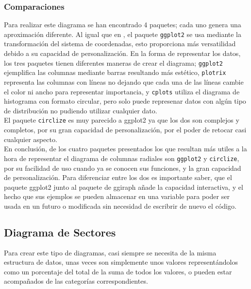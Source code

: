 \documentclass{article}\usepackage[]{graphicx}\usepackage[]{color}
\begin{document}
\subsubsection{Comparaciones}
Para realizar este diagrama se han encontrado 4 paquetes; cada uno genera una aproximaci\'on diferente.
Al igual que en , 
el paquete \texttt{ggplot2} se usa mediante la transformaci\'on del sistema de coordenadas, esto proporciona m\'as versatilidad debido a su capacidad de personalizaci\'on. En la forma de representar los datos, los tres paquetes tienen diferentes maneras de crear el diagrama; \texttt{ggplot2} ejemplifica las columnas mediante barras resultando m\'as est\'etico, \texttt{plotrix} representa las columnas con l\'ineas no dejando que cada una de las l\'ineas cambie el color ni ancho para representar importancia, y \texttt{cplots} utiliza el diagrama de histograma con formato circular, pero solo puede represenar datos con alg\'un tipo de distribuci\'on no pudiendo utilizar cualquier dato. ~\\
El paquete \texttt{circlize} es muy parecido a ggplot2 ya que los dos son complejos y completos, por su gran capacidad de personalizaci\'on, por el poder de retocar casi cualquier aspecto.~\\
En conclusi\'on, de los cuatro paquetes presentados los que resultan m\'as utiles a la hora de representar el diagrama de columnas radiales son \texttt{ggplot2} y \texttt{circlize}, por su facilidad de uso cuando ya se conocen sus funciones, y la gran capacidad de personalizaci\'on. Para diferenciar entre los dos es importante saber, que el paquete ggplot2 junto al paquete de ggiraph a\~nade la capacidad interactiva, y el hecho que sus ejemplos se pueden almacenar en una variable para poder ser usada en un futuro o modificada sin necesidad de escribrir de nuevo el c\'odigo.
\clearpage
\subsection{Diagrama de Sectores}\label{ssec:sectores}
Para crear este tipo de diagramas, casi siempre se necesita de la misma estructura de datos, unas veces son simplemente unos valores represent\'andolos como un porcentaje del total de la suma de todos los valores, o pueden estar acompa\~nados de las categor\'ias correspondientes.
\end{document}
